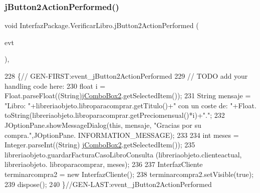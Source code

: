 \subsubsection{\texorpdfstring{j\+Button2\+Action\+Performed()}{jButton2ActionPerformed()}}
{\footnotesize\ttfamily void Interfaz\+Package.\+Verificar\+Libro.\+j\+Button2\+Action\+Performed (\begin{DoxyParamCaption}\item[{java.\+awt.\+event.\+Action\+Event}]{evt }\end{DoxyParamCaption})\hspace{0.3cm}{\ttfamily [inline]}, {\ttfamily [private]}}


\begin{DoxyCode}
228                                                                          \{\textcolor{comment}{//
      GEN-FIRST:event\_jButton2ActionPerformed}
229         \textcolor{comment}{// TODO add your handling code here:}
230         \textcolor{keywordtype}{float} i =  Float.parseFloat((String)\mbox{\hyperlink{class_interfaz_package_1_1_verificar_libro_a6e3256102994e7764c50c7a37aebc859}{jComboBox2}}.getSelectedItem());
231         String mensaje = \textcolor{stringliteral}{"Libro: "}+libreriaobjeto.libroparacomprar.getTitulo()+\textcolor{stringliteral}{" con un coste de: "}+Float.
      toString(libreriaobjeto.libroparacomprar.getPreciomensual()*i)+\textcolor{stringliteral}{"."};
232         JOptionPane.showMessageDialog(\textcolor{keyword}{this}, mensaje, \textcolor{stringliteral}{"Gracias por su compra."},JOptionPane.
      INFORMATION\_MESSAGE);
233         
234         \textcolor{keywordtype}{int} meses = Integer.parseInt((String) \mbox{\hyperlink{class_interfaz_package_1_1_verificar_libro_a6e3256102994e7764c50c7a37aebc859}{jComboBox2}}.getSelectedItem());
235         libreriaobjeto.guardarFacturaCasoLibroConsulta (libreriaobjeto.clienteactual, libreriaobjeto.
      libroparacomprar, meses);
236         
237         InterfazCliente terminarcompra2 = \textcolor{keyword}{new} InterfazCliente();
238         terminarcompra2.setVisible(\textcolor{keyword}{true});
239         dispose();
240     \}\textcolor{comment}{//GEN-LAST:event\_jButton2ActionPerformed}
\end{DoxyCode}
\mbox{\label{class_interfaz_package_1_1_verificar_libro_ab0bc4b49fa212e8da0ca24828257116d}} 
